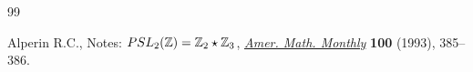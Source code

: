 \documentclass[10pt,a4paper]{amsart}
\begin{document}
\begin{thebibliography}{99}

\footnotesize\itemsep=0pt
Alperin R.C.,
Notes: ${\rm  {PSL}}_2(\mathbb Z)= \mathbb Z_2 \star \mathbb Z_3$,
\href{http://dx.doi.org/10.2307/2324963}{{\it Amer. Math. Monthly}} {\bf 100} (1993), 385--386.
\end{thebibliography}
\end{document}

